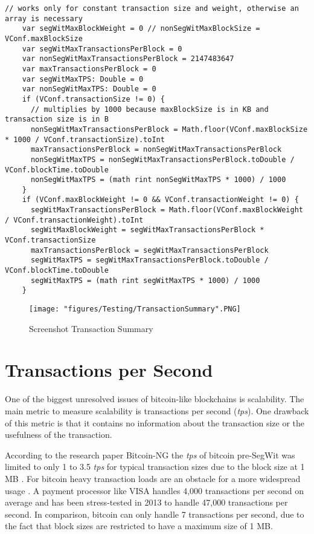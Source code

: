 \begin{minipage}{\linewidth}
\begin{lstlisting}[style=myScalastyle,label=lst:blockweightlimitCalculations,
caption={Calculations for the comparisons in the ReducerActor}]
// works only for constant transaction size and weight, otherwise an array is necessary
    var segWitMaxBlockWeight = 0 // nonSegWitMaxBlockSize = VConf.maxBlockSize
    var segWitMaxTransactionsPerBlock = 0
    var nonSegWitMaxTransactionsPerBlock = 2147483647
    var maxTransactionsPerBlock = 0
    var segWitMaxTPS: Double = 0
    var nonSegWitMaxTPS: Double = 0
    if (VConf.transactionSize != 0) {
      // multiplies by 1000 because maxBlockSize is in KB and transaction size is in B
      nonSegWitMaxTransactionsPerBlock = Math.floor(VConf.maxBlockSize * 1000 / VConf.transactionSize).toInt
      maxTransactionsPerBlock = nonSegWitMaxTransactionsPerBlock
      nonSegWitMaxTPS = nonSegWitMaxTransactionsPerBlock.toDouble / VConf.blockTime.toDouble
      nonSegWitMaxTPS = (math rint nonSegWitMaxTPS * 1000) / 1000
    }
    if (VConf.maxBlockWeight != 0 && VConf.transactionWeight != 0) {
      segWitMaxTransactionsPerBlock = Math.floor(VConf.maxBlockWeight / VConf.transactionWeight).toInt
      segWitMaxBlockWeight = segWitMaxTransactionsPerBlock * VConf.transactionSize
      maxTransactionsPerBlock = segWitMaxTransactionsPerBlock
      segWitMaxTPS = segWitMaxTransactionsPerBlock.toDouble / VConf.blockTime.toDouble
      segWitMaxTPS = (math rint segWitMaxTPS * 1000) / 1000
    }
\end{lstlisting}
\end{minipage}

\begin{figure}[!htb]
\centering
\texttt{[image: "figures/Testing/TransactionSummary".PNG]}
\caption{Screenshot Transaction Summary\label{fig:TransactionSummary}}
\end{figure}

\section{Transactions per Second}
One of the biggest unresolved issues of bitcoin-like blockchains is scalability. The main metric to measure scalability is transactions per second (\textit{tps}). One drawback of this metric is that it contains no information about the transaction size or the usefulness of the transaction.

According to the research paper Bitcoin-NG the \textit{tps} of bitcoin pre-SegWit was limited to only 1 to 3.5 \textit{tps} for typical transaction sizes due to the block size at 1 MB \cite{bitcoinNG}. For bitcoin heavy transaction loads are an obstacle for a more widespread usage \cite{gateway}. A payment processor like VISA handles 4,000 transactions per second on average and has been stress-tested in 2013 to handle 47,000 transactions per second. In comparison, bitcoin can only handle 7 transactions per second, due to the fact that block sizes are restricted to have a maximum size of 1 MB.

